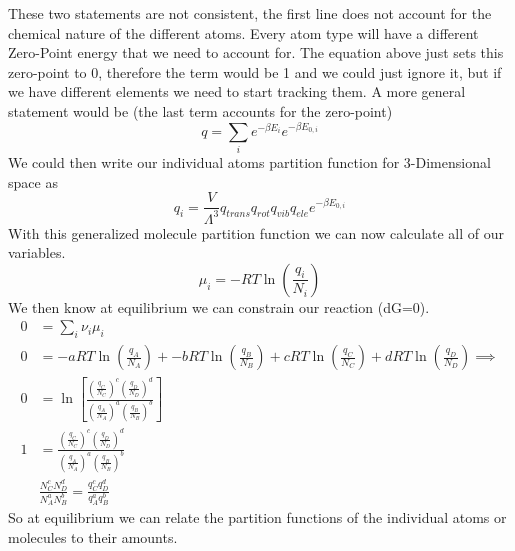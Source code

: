\documentclass{article}
\begin{document}
These two statements are not consistent, the first line does not account for the chemical nature of the different atoms. 
Every atom type will have a different Zero-Point energy that we need to account for.
The equation above just sets this zero-point to 0, therefore the term would be 1 and we could just ignore it, but if we have different elements we need to start tracking them.
A more general statement would be (the last term accounts for the zero-point) 
\begin{equation}
    q = \sum_i e^{-\beta E_i}e^{-\beta E_{0,i}}
\end{equation}
We could then write our individual atoms partition function for 3-Dimensional space as
\begin{equation}
    q_i = \frac{V}{\Lambda^3}q_{trans}q_{rot}q_{vib}q_{ele}e^{-\beta E_{0,i}}
\end{equation}
With this generalized molecule partition function we can now calculate all of our variables. 
\begin{equation}
    \mu_i = -RT\ln\left(\frac{q_i}{N_i}\right)
\end{equation}
We then know at equilibrium we can constrain our reaction (dG=0).
\begin{equation}
    \begin{split}
        0 &= \sum_i\nu_i\mu_i\\
        0 &= -aRT\ln\left(\frac{q_A}{N_A}\right) + -bRT\ln\left(\frac{q_B}{N_B}\right) + cRT\ln\left(\frac{q_C}{N_C}\right) + dRT\ln\left(\frac{q_D}{N_D}\right) \implies \\
        0 &= \ln\left[\frac{\left(\frac{q_C}{N_C}\right)^c\left(\frac{q_D}{N_D}\right)^d}{\left(\frac{q_A}{N_A}\right)^a\left(\frac{q_B}{N_B}\right)^b}\right] \\
        1 &= \frac{\left(\frac{q_C}{N_C}\right)^c\left(\frac{q_D}{N_D}\right)^d}{\left(\frac{q_A}{N_A}\right)^a\left(\frac{q_B}{N_B}\right)^b} \\
        & \frac{N_C^c N_D^d}{N_A^a N_B^b} = \frac{q_C^c q_D^d}{q_A^a q_B^b}
    \end{split}
\end{equation}
So at equilibrium we can relate the partition functions of the individual atoms or molecules to their amounts. 
\end{document}
